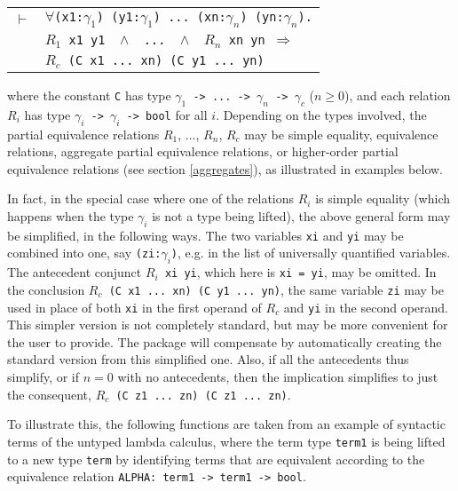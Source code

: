 \documentclass[envcountsame,runningheads]{llncs}
\newcommand{\quotient}{partial equivalence}
\begin{document}
\begin{center}
\begin{tabular}{rl}
$\vdash$&
{\tt $\forall$(x1:$\gamma_1$) (y1:$\gamma_1$) ... (xn:$\gamma_n$) (yn:$\gamma_n$).}
\\
& \hspace{12mm}
{\tt $R_1$ x1 y1 \
$\wedge$ \ 
... \
$\wedge$ \ 
$R_n$ xn yn \;$\Rightarrow$
}  \\
& \hspace{12mm}
{\tt $R_c$ (C x1 ... xn) (C y1 ... yn)}  \\
\end{tabular}
\end{center}
where the constant {\tt C} has type
{\tt $\gamma_1$ -> ... -> $\gamma_n$ -> $\gamma_c$} ($n \ge 0$),
and each relation {\tt $R_i$} has type {\tt $\gamma_i$ -> $\gamma_i$ -> bool}
for all $i$.
Depending on the types involved, 
the \quotient{} relations $R_1$, ..., $R_n$, $R_c$
may be simple equality, equivalence relations,
aggregate \quotient{} relations,
or higher-order \quotient{} relations (see section \ref{aggregates}),
as illustrated in examples below.

In fact, in the special case where one of the relations $R_i$ is simple
equality (which happens when the type
$\gamma_i$ is not a type being lifted),
the above general form may be simplified, in the following ways.
The two variables {\tt xi} and {\tt yi} may be combined into one,
say {\tt (zi:$\gamma_i$)}, e.g. in the list of universally quantified variables.
The antecedent conjunct {\tt $R_i$ xi yi}, which here is {\tt xi = yi},
may be omitted.  In the conclusion {\tt $R_c$ (C x1 ... xn) (C y1 ... yn)},
the same variable {\tt zi} may be used in place of both {\tt xi} in the first
operand of {\tt $R_c$} and {\tt yi} in the second operand.  This simpler
version is not completely standard, but may be more convenient for
the user to provide.  The package will compensate by automatically
creating the standard version from this simplified one.
Also, if all the antecedents thus simplify,
or if $n = 0$ with no antecedents,
then the implication
simplifies
to just the consequent, {\tt $R_c$ (C z1 ... zn) (C z1 ... zn)}.

To illustrate this, the following functions are taken from an example
of syntactic terms of the untyped lambda calculus,
where the term type {\tt term1}
is being lifted to a new type {\tt term}
by identifying terms that are equivalent
according to the equivalence relation {\tt ALPHA: term1 -> term1 -> bool}.
\end{document}

